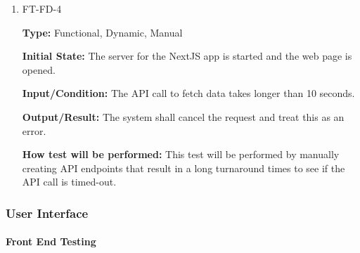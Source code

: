 \documentclass[12pt, titlepage]{article}
\begin{document}
\begin{enumerate}
\item{FT-FD-4}

\textbf{Type:} Functional, Dynamic, Manual
                    
\textbf{Initial State:} The server for the NextJS app is started and the web page is opened.
                    
\textbf{Input/Condition:} The API call to fetch data takes longer than 10 seconds.
                    
\textbf{Output/Result:} The system shall cancel the request and treat this as an error.
                    
\textbf{How test will be performed:} This test will be performed by manually creating API endpoints that result in a long turnaround times to see if the API call is timed-out.

\end{enumerate}

\subsubsection{User Interface}
		
\paragraph{Front End Testing}
\end{document}

